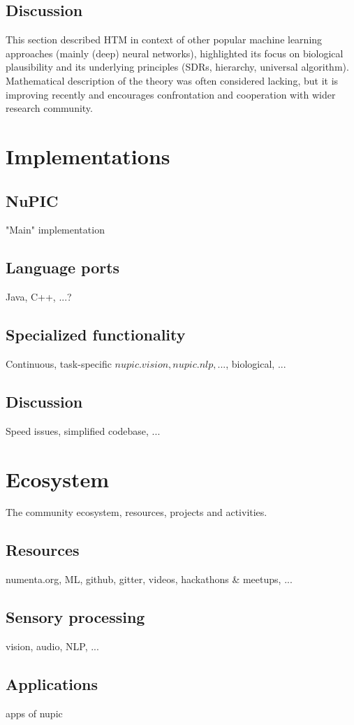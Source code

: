 \documentclass[a4,IEEEconf]{article}
\begin{document}
\subsection{Discussion}
This section described HTM in context of other popular machine learning approaches (mainly (deep) neural networks), highlighted its focus on biological plausibility and its underlying principles (SDRs, hierarchy, universal algorithm). Mathematical description of the theory was often considered lacking, but it is improving recently and encourages confrontation and cooperation with wider research community. 

\section{Implementations}
\subsection{NuPIC}
"Main" implementation
\subsection{Language ports}
Java, C++, ...?
\subsection{Specialized functionality}
Continuous, task-specific \(nupic.vision, nupic.nlp,...\), biological, ...
\subsection{Discussion}
Speed issues, simplified codebase, ...

\section{Ecosystem}
The community ecosystem, resources, projects and activities. 
\subsection{Resources}
numenta.org, ML, github, gitter, videos, hackathons \& meetups, ...
\subsection{Sensory processing}
vision, audio, NLP, ...
\subsection{Applications}
apps of nupic
\end{document}

